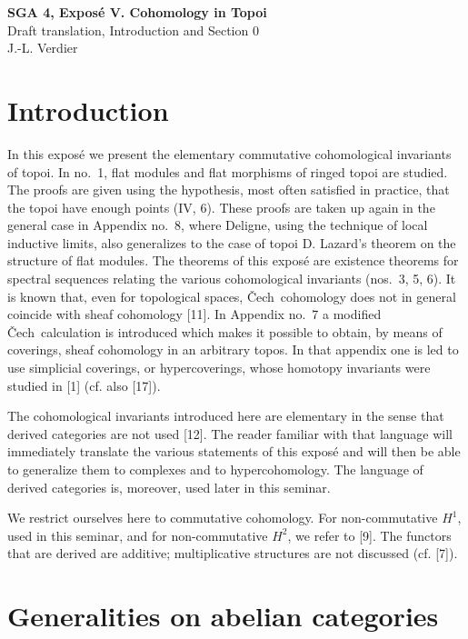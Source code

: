\documentclass[11pt]{article}
\newcommand{\Cech}{\v{C}ech}
\begin{document}
\begin{center}
{\Large \textbf{SGA 4, Expos\'e V. Cohomology in Topoi}}\\[0.35em]
{\large Draft translation, Introduction and Section 0}\\[0.35em]
J.-L. Verdier
\end{center}

\bigskip


\section*{Introduction}

In this expos\'e we present the elementary commutative cohomological invariants of topoi. In no.~1, flat modules and flat morphisms of ringed topoi are studied. The proofs are given using the hypothesis, most often satisfied in practice, that the topoi have enough points (IV, 6). These proofs are taken up again in the general case in Appendix no.~8, where Deligne, using the technique of local inductive limits, also generalizes to the case of topoi D. Lazard's theorem on the structure of flat modules. The theorems of this expos\'e are existence theorems for spectral sequences relating the various cohomological invariants (nos.~3, 5, 6). It is known that, even for topological spaces, \Cech\ cohomology does not in general coincide with sheaf cohomology [11]. In Appendix no.~7 a modified \Cech\ calculation is introduced which makes it possible to obtain, by means of coverings, sheaf cohomology in an arbitrary topos. In that appendix one is led to use simplicial coverings, or hypercoverings, whose homotopy invariants were studied in [1] (cf. also [17]).

The cohomological invariants introduced here are elementary in the sense that derived categories are not used [12]. The reader familiar with that language will immediately translate the various statements of this expos\'e and will then be able to generalize them to complexes and to hypercohomology. The language of derived categories is, moreover, used later in this seminar.

We restrict ourselves here to commutative cohomology. For non-commutative $H^1$, used in this seminar, and for non-commutative $H^2$, we refer to [9]. The functors that are derived are additive; multiplicative structures are not discussed (cf. [7]).

\setcounter{section}{-1}
\section{Generalities on abelian categories}
\end{document}
